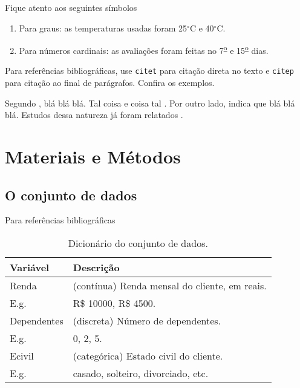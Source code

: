 \documentclass[9pt, a4paper, twocolumn]{article}
\begin{document}
Fique atento aos seguintes símbolos

\begin{enumerate}
\item Para graus: as temperaturas usadas foram 25$^{\circ}$C e 40$^{\circ}$C.
\item Para números cardinais: as avaliações foram feitas no
  7\textsuperscript{\underline{o}} e 15\textsuperscript{\underline{o}}
  dias.
\end{enumerate}

Para referências bibliográficas, use \texttt{citet} para citação direta
no texto e \texttt{citep} para citação ao final de parágrafos. Confira os
exemplos.

Segundo \citet{wickham2016r}, blá blá blá. Tal coisa e coisa tal
\citep{bruce2019estatistica}. Por outro lado, \citet{grus2019data}
indica que blá blá blá. Estudos dessa natureza já foram relatados
\citep{bruce2019estatistica, fawcett2018data}.


\section{Materiais e Métodos}

\lipsum[6]

\subsection{O conjunto de dados}
Para referências bibliográficas
\lipsum[7]


\begin{table}[H]
  \caption{Dicionário do conjunto de dados.}
  \begin{tabular}{m{2.5cm} m{5cm}}
    \hline
    Variável & Descrição \\ \hline
    Renda & (contínua) Renda mensal do cliente, em reais. \\
    E.g. &  R\$ 10000, R\$ 4500.\\ \hline
    Dependentes & (discreta) Número de dependentes. \\
    E.g. & 0, 2, 5. \\ \hline
    Ecivil & (categórica) Estado civil do cliente. \\
    E.g. & casado, solteiro, divorciado, etc. \\ \hline
  \end{tabular}
\end{table}
\end{document}
